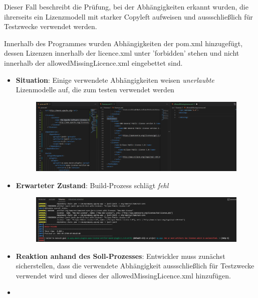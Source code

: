 Dieser Fall beschreibt die Prüfung, bei der Abhängigkeiten erkannt wurden, die ihrerseits ein Lizenzmodell mit starker Copyleft aufweisen und aussschließlich für Testzwecke verwendet werden. 

Innerhalb des Programmes wurden Abhängigkeiten der pom.xml hinzugefügt, dessen Lizenzen innerhalb der licence.xml unter 'forbidden' stehen und nicht innerhalb der allowedMissingLicence.xml eingebettet sind. 

\begin{itemize}
    \item \textbf{Situation}: Einige verwendete Abhängigkeiten weisen \textit{unerlaubte} Lizenmodelle auf, die zum testen verwendet werden
    
    \begin{figure}[h]
        \centering
        \includegraphics[scale=0.4]{Bilder/Fall5Situation.png}
    \end{figure}

    \item \textbf{Erwarteter Zustand}: Build-Prozess schlägt \textit{fehl} 

    \begin{figure}[h]
        \centering
        \includegraphics[scale=0.4]{Bilder/Fall5Zustand.png}
    \end{figure}

    \item \textbf{Reaktion anhand des Soll-Prozesses}: Entwickler muss zunächst sicherstellen, dass die verwendete Abhängigkeit aussschließlich für Testzwecke verwendet wird und dieses der allowedMissingLicence.xml hinzufügen. 
    \item {}
\end{itemize}

